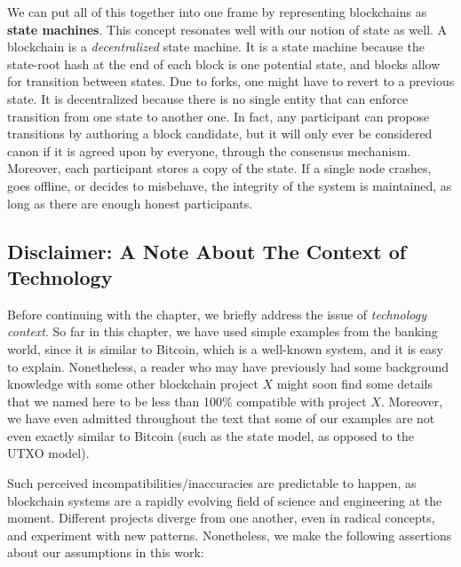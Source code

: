 We can put all of this together into one frame by representing blockchains as \textbf{state
machines}. This concept resonates well with our notion of state as well. A blockchain is a
\textit{decentralized} state machine. It is a state machine because the state-root hash at the end
of each block is one potential state, and blocks allow for transition between states. Due to forks,
one might have to revert to a previous state. It is decentralized because there is no single entity
that can enforce transition from one state to another one. In fact, any participant can propose
transitions by authoring a block candidate, but it will only ever be considered canon if it is
agreed upon by everyone, through the consensus mechanism. Moreover, each participant stores a copy
of the state. If a single node crashes, goes offline, or decides to misbehave, the integrity of the
system is maintained, as long as there are enough honest participants.


\subsection{Disclaimer: A Note About The Context of Technology}

Before continuing with the chapter, we briefly address the issue of \textit{technology context}. So
far in this chapter, we have used simple examples from the banking world, since it is similar to
Bitcoin, which is a well-known system, and it is easy to explain. Nonetheless, a reader who may have
previously had some background knowledge with some other blockchain project $X$ might soon find some
details that we named here to be less than 100\% compatible with project $X$. Moreover, we have even
admitted throughout the text that some of our examples are not even exactly similar to Bitcoin (such
as the state model, as opposed to the UTXO model).

Such perceived incompatibilities/inaccuracies are predictable to happen, as blockchain systems are a
rapidly evolving field of science and engineering at the moment. Different projects diverge from one
another, even in radical concepts, and experiment with new patterns. Nonetheless, we make the
following assertions about our assumptions in this work:

